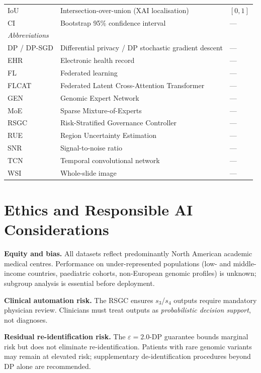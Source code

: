 \documentclass{ieeeaccess}
\begin{document}
\begin{table}[!t]
\begin{tabular}{lll}
IoU & Intersection-over-union (XAI localisation) & $[0,1]$\\
CI & Bootstrap 95\% confidence interval & ---\\
\midrule
\multicolumn{3}{l}{\textit{Abbreviations}}\\
DP / DP-SGD & Differential privacy / DP stochastic gradient descent & ---\\
EHR & Electronic health record & ---\\
FL & Federated learning & ---\\
FLCAT & Federated Latent Cross-Attention Transformer & ---\\
GEN & Genomic Expert Network & ---\\
MoE & Sparse Mixture-of-Experts & ---\\
RSGC & Risk-Stratified Governance Controller & ---\\
RUE & Region Uncertainty Estimation & ---\\
SNR & Signal-to-noise ratio & ---\\
TCN & Temporal convolutional network & ---\\
WSI & Whole-slide image & ---\\
\bottomrule
\end{tabular}
\end{table}


\section{Ethics and Responsible AI Considerations}
\label{sec:ethics}

\textbf{Equity and bias.} All datasets reflect predominantly North American
academic medical centres. Performance on under-represented populations
(low- and middle-income countries, paediatric cohorts, non-European genomic
profiles) is unknown; subgroup analysis is essential before deployment.

\textbf{Clinical automation risk.} The RSGC ensures $s_3$/$s_4$ outputs
require mandatory physician review. Clinicians must treat outputs as
\emph{probabilistic decision support}, not diagnoses.

\textbf{Residual re-identification risk.} The $\varepsilon\!=\!2.0$-DP
guarantee bounds marginal risk but does not eliminate re-identification.
Patients with rare genomic variants may remain at elevated risk; supplementary
de-identification procedures beyond DP alone are recommended.
\end{document}
